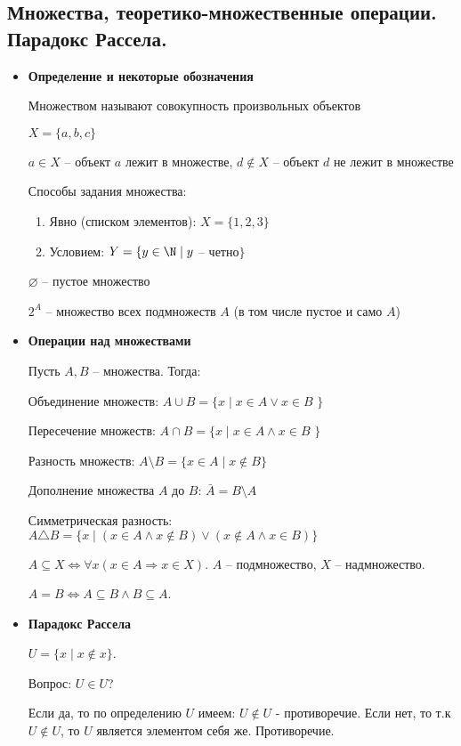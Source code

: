 \subsection{Множества, теоретико-множественные операции. Парадокс Рассела.}
\begin{itemize}
	\item \textbf{Определение и некоторые обозначения}
	
Множеством называют совокупность произвольных объектов

$X = \{a, b, c\}$

$a \in X$ -- объект $a$ лежит в множестве, $d \notin X$ -- объект $d$ не лежит в множестве

Способы задания множества:
\begin{enumerate}
	\item Явно (списком элементов): $X = \{1, 2, 3\}$
	\item Условием: $Y = \{ y \in \N \mid y$ -- четно$\}$
\end{enumerate}

$\varnothing$ -- пустое множество

$2^{A}$ -- множество всех подмножеств $A$ (в том числе пустое и само $A$)

\item \textbf{Операции над множествами}

Пусть $A, B$ -- множества. Тогда:

Объединение множеств: $A \cup B = \{x \mid x \in A \vee x \in B$ $\}$

Пересечение множеств: $A \cap B = \{x \mid x \in A \wedge x \in B$ $\}$

Разность множеств: $A \setminus B = \{x \in A \mid x \notin B \}$

Дополнение множества $A$ до $B$: $\bar{A} = B \setminus A$

Симметрическая разность: $A \triangle B = \{x \mid (x \in A \wedge x \notin B) \vee (x \notin A \wedge x \in B) \}$

$A \subseteq X \Leftrightarrow \forall x (x \in A \Rightarrow x \in X)$. $A$ -- подмножество, $X$ -- надмножество.

$A = B \Leftrightarrow A \subseteq B \wedge B \subseteq A$.

\item \textbf{Парадокс Рассела}

$U = \{x \mid x \notin x\}$.

Вопрос: $U \in U$?

Если да, то по определению $U$ имеем: $U \notin U$ - противоречие. Если нет, то т.к $U \notin U$, то $U$ является элементом себя же. Противоречие.

\end{itemize}